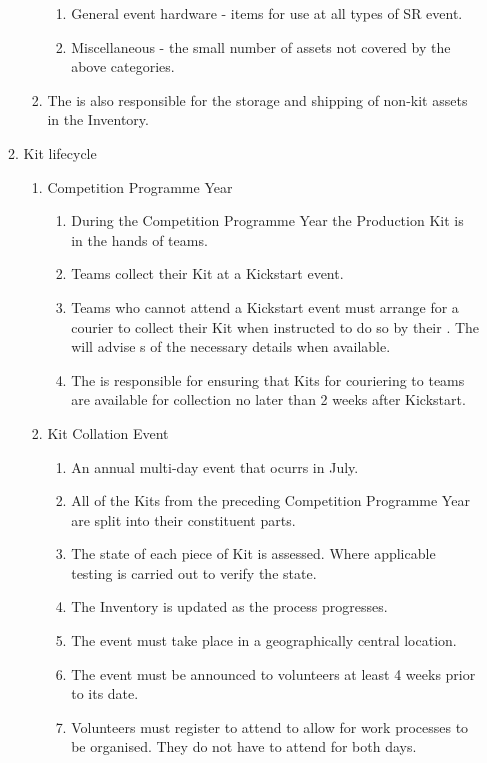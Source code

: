\begin{draft}
\begin{enumerate}
\begin{enumerate}
\begin{enumerate}
\begin{enumerate}
          \item General event hardware - items for use at all types of SR event.
          \item Miscellaneous - the small number of assets not covered by the above categories.
        \end{enumerate}
      \item The  is also responsible for the storage and shipping of non-kit assets in the Inventory.
    \end{enumerate}
  \item Kit lifecycle
    \begin{enumerate}
      \item Competition Programme Year
        \begin{enumerate}
          \item During the Competition Programme Year the Production Kit is in the hands of teams.
          \item Teams collect their Kit at a Kickstart event.
          \item Teams who cannot attend a Kickstart event must arrange for a courier to collect their Kit when instructed to do so by their . The  will advise s of the necessary details when available.
          \item The  is responsible for ensuring that Kits for couriering to teams are available for collection no later than 2 weeks after Kickstart.
        \end{enumerate}
      \item Kit Collation Event
        \begin{enumerate}
          \item An annual multi-day event that ocurrs in July.
          \item All of the Kits from the preceding Competition Programme Year are split into their constituent parts.
          \item The state of each piece of Kit is assessed. Where applicable testing is carried out to verify the state.
          \item The Inventory is updated as the process progresses.
          \item The event must take place in a geographically central location.
          \item The event must be announced to volunteers at least 4 weeks prior to its date.
          \item Volunteers must register to attend to allow for work processes to be organised. They do not have to attend for both days.

\end{enumerate}
\end{enumerate}
\end{enumerate}
\end{enumerate}
\end{draft}
